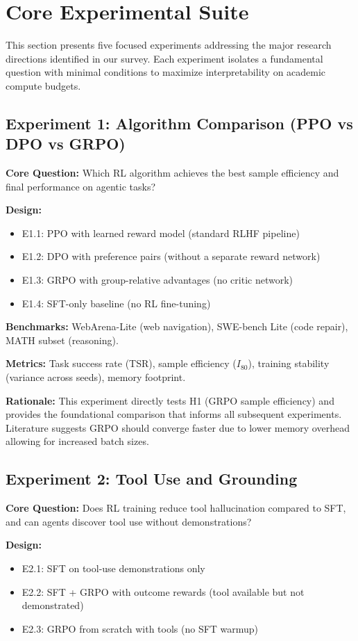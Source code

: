 \documentclass[12pt,a4paper]{report}
\theoremstyle{definition}
\begin{document}
\section*{Core Experimental Suite}
\label{sec:comprehensive_experiments}

This section presents five focused experiments addressing the major research directions identified in our survey. Each experiment isolates a fundamental question with minimal conditions to maximize interpretability on academic compute budgets.

\subsection{Experiment 1: Algorithm Comparison (PPO vs DPO vs GRPO)}
\textbf{Core Question:} Which RL algorithm achieves the best sample efficiency and final performance on agentic tasks?

\textbf{Design:}
\begin{itemize}
    \item E1.1: PPO with learned reward model (standard RLHF pipeline)
    \item E1.2: DPO with preference pairs (without a separate reward network)
    \item E1.3: GRPO with group-relative advantages (no critic network)
    \item E1.4: SFT-only baseline (no RL fine-tuning)
\end{itemize}

\textbf{Benchmarks:} WebArena-Lite (web navigation), SWE-bench Lite (code repair), MATH subset (reasoning).

\textbf{Metrics:} Task success rate (TSR), sample efficiency ($I_{80}$), training stability (variance across seeds), memory footprint.

\textbf{Rationale:} This experiment directly tests H1 (GRPO sample efficiency) and provides the foundational comparison that informs all subsequent experiments. Literature suggests GRPO should converge faster due to lower memory overhead allowing for increased batch sizes.

\subsection{Experiment 2: Tool Use and Grounding}
\textbf{Core Question:} Does RL training reduce tool hallucination compared to SFT, and can agents discover tool use without demonstrations?

\textbf{Design:}
\begin{itemize}
    \item E2.1: SFT on tool-use demonstrations only
    \item E2.2: SFT + GRPO with outcome rewards (tool available but not demonstrated)
    \item E2.3: GRPO from scratch with tools (no SFT warmup)
\end{itemize}
\end{document}
